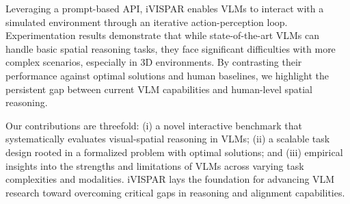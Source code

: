 Leveraging a prompt-based API, iVISPAR enables VLMs to interact with a simulated environment through an iterative action-perception loop. Experimentation results demonstrate that while state-of-the-art VLMs can handle basic spatial reasoning tasks, they face significant difficulties with more complex scenarios, especially in 3D environments. By contrasting their performance against optimal solutions and human baselines, we highlight the persistent gap between current VLM capabilities and human-level spatial reasoning.

Our contributions are threefold: (i) a novel interactive benchmark that systematically evaluates visual-spatial reasoning in VLMs; (ii) a scalable task design rooted in a formalized problem with optimal solutions; and (iii) empirical insights into the strengths and limitations of VLMs across varying task complexities and modalities. iVISPAR lays the foundation for advancing VLM research toward overcoming critical gaps in reasoning and alignment capabilities.
